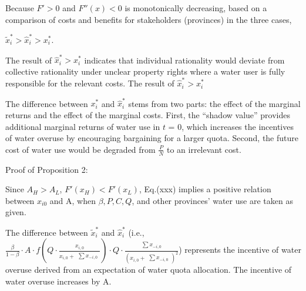 \documentclass[preprint, 12pt]{elsarticle}
\providecommand{\DIFaddbegin}{} %
\providecommand{\DIFaddend}{} %
\begin{document}
Because $F'>0$ and $F''(x)<0$ is monotonically decreasing, based on a comparison of costs and benefits for stakeholders (provinces) in the three cases,

$\widetilde x_i^*>\hat x_i^*>x_i^*$.

The result of $\hat x_i^*>x_i^*$ indicates that individual rationality would deviate from collective rationality under unclear property rights where a water user is fully responsible for the relevant costs. The result of $\hat x_i^*>x_i^*$

The difference between $ x_i^*$ and $\hat x_i^*$ stems from two parts: the effect of the marginal returns and the effect of the marginal costs. First, the ``shadow value'' provides additional marginal returns of water use in $t$ = 0, which increases the incentives of water overuse by encouraging bargaining for a larger quota. Second, the future cost of water use would be degraded from $\frac{P}{N}$ to an irrelevant cost.

Proof of Proposition 2:

Since $A_H>A_L$, $F'(x_H)<F'(x_L)$,
Eq.(xxx) %
implies a positive relation between $x_{i0}$ and A, when $\beta, P, C, Q$, and other provinces' water use are taken as given.

The difference between $\widetilde x_i^*$ and $\hat x_i^*$ (i.e., $\frac{\beta}{1-\beta} \cdot A \cdot f(Q \cdot \frac{x_{i,0}}{x_{i,0} + \begin{matrix} \sum x_{-i,0} \end{matrix}}) \cdot Q \cdot \frac{\begin{matrix} \sum x_{-i,0} \end{matrix}}{(x_{i,0} + \begin{matrix} \sum x_{-i,0} \end{matrix})^2}$) represents the incentive of water overuse derived from an expectation of water quota allocation. The incentive of water overuse increases by A.

\DIFaddbegin



\DIFaddend
\end{document}
